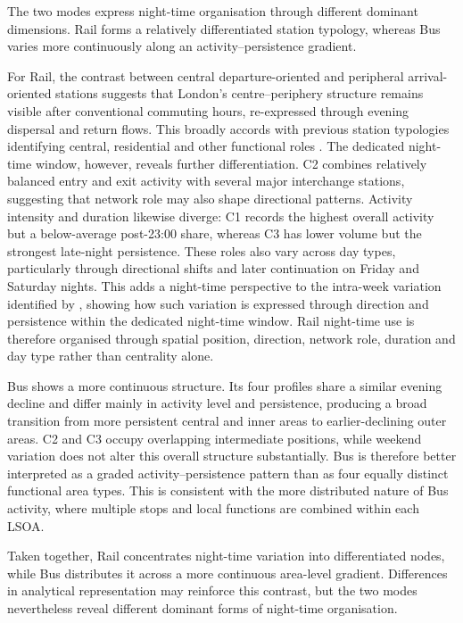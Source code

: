 The two modes express night-time organisation through different dominant dimensions. Rail forms a relatively differentiated station typology, whereas Bus varies more continuously along an activity--persistence gradient.

For Rail, the contrast between central departure-oriented and peripheral arrival-oriented stations suggests that London's centre--periphery structure remains visible after conventional commuting hours, re-expressed through evening dispersal and return flows. This broadly accords with previous station typologies identifying central, residential and other functional roles \citep{Gan2020,Verma2021,Zhang2021}. The dedicated night-time window, however, reveals further differentiation. C2 combines relatively balanced entry and exit activity with several major interchange stations, suggesting that network role may also shape directional patterns. Activity intensity and duration likewise diverge: C1 records the highest overall activity but a below-average post-23:00 share, whereas C3 has lower volume but the strongest late-night persistence. These roles also vary across day types, particularly through directional shifts and later continuation on Friday and Saturday nights. This adds a night-time perspective to the intra-week variation identified by \citet{Cheng2024}, showing how such variation is expressed through direction and persistence within the dedicated night-time window. Rail night-time use is therefore organised through spatial position, direction, network role, duration and day type rather than centrality alone.

Bus shows a more continuous structure. Its four profiles share a similar evening decline and differ mainly in activity level and persistence, producing a broad transition from more persistent central and inner areas to earlier-declining outer areas. C2 and C3 occupy overlapping intermediate positions, while weekend variation does not alter this overall structure substantially. Bus is therefore better interpreted as a graded activity--persistence pattern than as four equally distinct functional area types. This is consistent with the more distributed nature of Bus activity, where multiple stops and local functions are combined within each LSOA.

Taken together, Rail concentrates night-time variation into differentiated nodes, while Bus distributes it across a more continuous area-level gradient. Differences in analytical representation may reinforce this contrast, but the two modes nevertheless reveal different dominant forms of night-time organisation.

